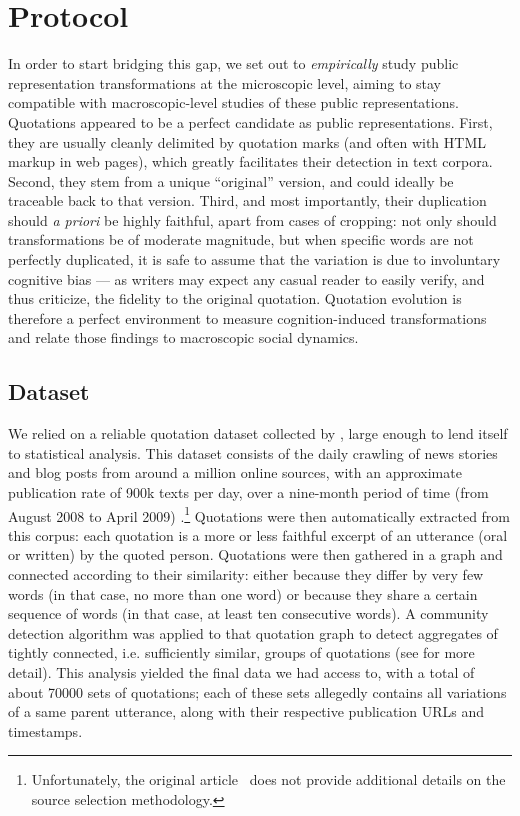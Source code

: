 \section{Protocol} %
\label{sec:protocol}

In order to start bridging this gap, we set out to \emph{empirically} study public representation transformations at the microscopic level, aiming to stay compatible with macroscopic-level studies of these public representations.
Quotations appeared to be a perfect candidate as public representations.
First, they are usually cleanly delimited by quotation marks (and often with HTML markup in web pages), which greatly facilitates their detection in text corpora.
Second, they stem from a unique ``original'' version, and could ideally be traceable back to that version.
Third, and most importantly, their duplication should \emph{a priori} be highly faithful, apart from cases of cropping: not only should transformations be of moderate magnitude, but when specific words are not perfectly duplicated, it is safe to assume that the variation is due to involuntary cognitive bias --- as writers may expect any casual reader to easily verify, and thus criticize, the fidelity to the original quotation.
Quotation evolution is therefore a perfect environment to measure cognition-induced transformations and relate those findings to macroscopic social dynamics.

\subsection{Dataset}

We relied on a reliable quotation dataset collected by \citet{Leskovec09}, large enough to lend itself to statistical analysis.
This dataset consists of the daily crawling of news stories and blog posts from around a million online sources, with an approximate publication rate of 900k texts per day, over a nine-month period of time (from August 2008 to April 2009) \cite{Leskovec09-url}.\footnote{Unfortunately, the original article~\citep{Leskovec09} does not provide additional details on the source selection methodology.}
Quotations were then automatically extracted from this corpus: each quotation is a more or less faithful excerpt of an utterance (oral or written) by the quoted person.
Quotations were then gathered in a graph and connected according to their similarity: either because they differ by very few words (in that case, no more than one word) or because they share a certain sequence of words (in that case, at least ten consecutive words).
A community detection algorithm was applied to that quotation graph to detect aggregates of tightly connected, i.e. sufficiently similar, groups of quotations (see \citet{Leskovec09} for more detail).
This analysis yielded the final data we had access to, with a total of about \num{70000} sets of quotations; each of these sets allegedly contains all variations of a same parent utterance, along with their respective publication URLs and timestamps.

